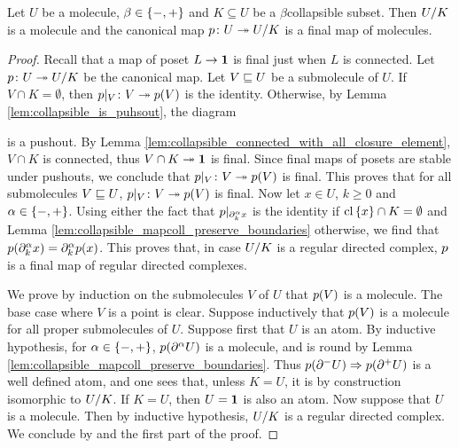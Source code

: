 \begin{prop} \label{prop:collapsible_collapse_to_molecules}
    Let \( U \) be a molecule, \( \beta \in \set{-, +} \) and \( K \subseteq U \) be a \( \beta \)\nbd collapsible subset.
    Then \( \coll{K}{U} \) is a molecule and the canonical map \( \mapcoll \colon U \surj \coll{K}{U} \) is a final map of molecules.
\end{prop}
\begin{proof}
    Recall that a map of poset \( L \to \pt \) is final just when \( L \) is connected. 
    Let \( \mapcoll \colon U \surj \coll{K}{U} \) be the canonical map.
    Let \( V \submol U \) be a submolecule of \( U \). 
    If \( V \cap K = \emptyset \), then \( \restr{\mapcoll}{V} \colon V \surj \mapcoll(V) \) is the identity.
    Otherwise, by Lemma \ref{lem:collapsible_is_puhsout}, the diagram
    \begin{center}
    \end{center}
    is a pushout.
    By Lemma \ref{lem:collapsible_connected_with_all_closure_element}, \( V \cap K \) is connected, thus \( V \cap K \surj \pt \) is final.
    Since final maps of posets are stable under pushouts, we conclude that \( \restr{\mapcoll}{V} \colon V \surj \mapcoll(V) \) is final.
    This proves that for all submolecules \( V \submol U \), \( \restr{\mapcoll}{V} \colon V \surj \mapcoll(V) \) is final.
    Now let \( x \in U \), \( k \geq 0 \) and \( \a \in \set{-, +} \).
    Using either the fact that \( \restr{p}{\bd{k}{\a} x} \) is the identity if \( \clset{x} \cap K = \emptyset \) and Lemma \ref{lem:collapsible_mapcoll_preserve_boundaries} otherwise, we find that \( \mapcoll(\bd{k}{\a} x) = \bd{k}{\a} \mapcoll(x) \).
    This proves that, in case \( \coll{K}{U} \) is a regular directed complex, \( \mapcoll \) is a final map of regular directed complexes.

    We prove by induction on the submolecules \( V \) of \( U \) that \( \mapcoll(V) \) is a molecule.
    The base case where \( V \) is a point is clear.
    Suppose inductively that \( \mapcoll(V) \) is a molecule for all proper submolecules of \( U \).
    Suppose first that \( U \) is an atom.
    By inductive hypothesis, for \( \a \in \set{-, +} \), \( p(\bd{}{\a} U) \) is a molecule, and is round by Lemma \ref{lem:collapsible_mapcoll_preserve_boundaries}.
    Thus \( p(\bd{}{-} U) \celto p(\bd{}{+} U) \) is a well defined atom, and one sees that, unless \( K = U \), it is by construction isomorphic to \( \coll{K}{U} \).
    If \( K = U \), then \( U = \pt \) is also an atom. 
    Now suppose that \( U \) is a molecule.
    Then by inductive hypothesis, \( \coll{K}{U} \) is a regular directed complex.
    We conclude by \cite[Proposition 6.2.33]{hadzihasanovic2024combinatorics} and the first part of the proof.
\end{proof}

